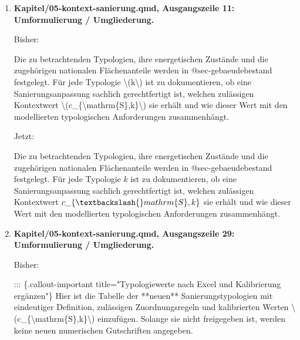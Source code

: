 \documentclass[
  ngerman,
  a4paper,
  DIV=11]{scrreprt}
\newenvironment{Shaded}{\begin{snugshade}}{\end{snugshade}}
\newcommand{\NormalTok}[1]{\textcolor[rgb]{0.00,0.23,0.31}{#1}}
\begin{document}
\begin{enumerate}
  Jetzt:

\begin{Shaded}
\begin{Highlighting}[]
\NormalTok{::: \{.callout{-}note title="Parameterstand"\}}
\NormalTok{Das nationale elektrische Budget ist berechnet. Nutzungsbezogene PE{-}Gutschriften sind für Transition nicht numerisch festgelegt, da Faktorensatz, Zielverkehrsanteile und Nutzflächen hierfür nicht gemeinsam bestimmt sind. Die historischen Werte dokumentieren den Bewertungsstand 2023.}
\end{Highlighting}
\end{Shaded}
\item
  \textbf{Kapitel/05-kontext-sanierung.qmd, Ausgangszeile 11:
  Umformulierung / Umgliederung.}

  Bisher:

\begin{Shaded}
\begin{Highlighting}[]
\NormalTok{Die zu betrachtenden Typologien, ihre energetischen Zustände und die zugehörigen nationalen Flächenanteile werden in @sec{-}gebaeudebestand festgelegt. Für jede Typologie \textbackslash{}(k\textbackslash{}) ist zu dokumentieren, ob eine Sanierungsanpassung sachlich gerechtfertigt ist, welchen zulässigen Kontextwert \textbackslash{}(c\_\{\textbackslash{}mathrm\{S\},k\}\textbackslash{}) sie erhält und wie dieser Wert mit den modellierten typologischen Anforderungen zusammenhängt.}
\end{Highlighting}
\end{Shaded}

  Jetzt:

\begin{Shaded}
\begin{Highlighting}[]
\NormalTok{Die zu betrachtenden Typologien, ihre energetischen Zustände und die zugehörigen nationalen Flächenanteile werden in @sec{-}gebaeudebestand festgelegt. Für jede Typologie $k$ ist zu dokumentieren, ob eine Sanierungsanpassung sachlich gerechtfertigt ist, welchen zulässigen Kontextwert $c\_\{\textbackslash{}mathrm\{S\},k\}$ sie erhält und wie dieser Wert mit den modellierten typologischen Anforderungen zusammenhängt.}
\end{Highlighting}
\end{Shaded}
\item
  \textbf{Kapitel/05-kontext-sanierung.qmd, Ausgangszeile 29:
  Umformulierung / Umgliederung.}

  Bisher:

\begin{Shaded}
\begin{Highlighting}[]
\NormalTok{::: \{.callout{-}important title="Typologiewerte nach Excel und Kalibrierung ergänzen"\}}
\NormalTok{Hier ist die Tabelle der **neuen** Sanierungstypologien mit eindeutiger Definition, zulässigen Zuordnungsregeln und kalibrierten Werten \textbackslash{}(c\_\{\textbackslash{}mathrm\{S\},k\}\textbackslash{}) einzufügen. Solange sie nicht freigegeben ist, werden keine neuen numerischen Gutschriften angegeben.}
\end{Highlighting}
\end{Shaded}


\end{enumerate}
\end{document}
